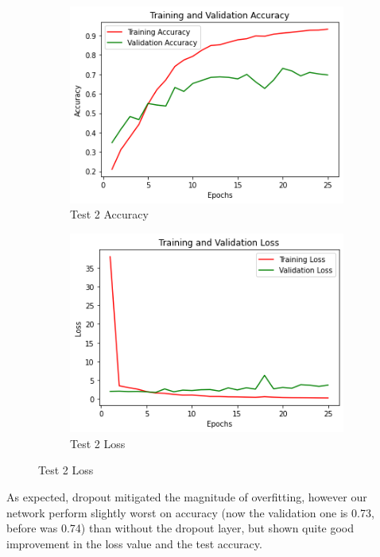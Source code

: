 \begin{figure}[H]
	\begin{subfigure}{0.5\textwidth}
		\includegraphics[width=0.9\linewidth]{img/vgg16/vgg16fe2acc.png} 
		\caption{Test 2 Accuracy}
		\label{fig:vgg16fe2acc}
	\end{subfigure}
	\begin{subfigure}{0.5\textwidth}
		\includegraphics[width=0.9\linewidth]{img/vgg16/vgg16fe2loss.png}
		\caption{Test 2 Loss}
		\label{fig:vgg16fe2oss}
	\end{subfigure}
\end{figure}

\noindent As expected, dropout mitigated the magnitude of overfitting, however our network perform slightly worst on accuracy (now the validation one is 0.73, before was 0.74) than without the dropout layer, but shown quite good improvement in the loss value and the test accuracy.


